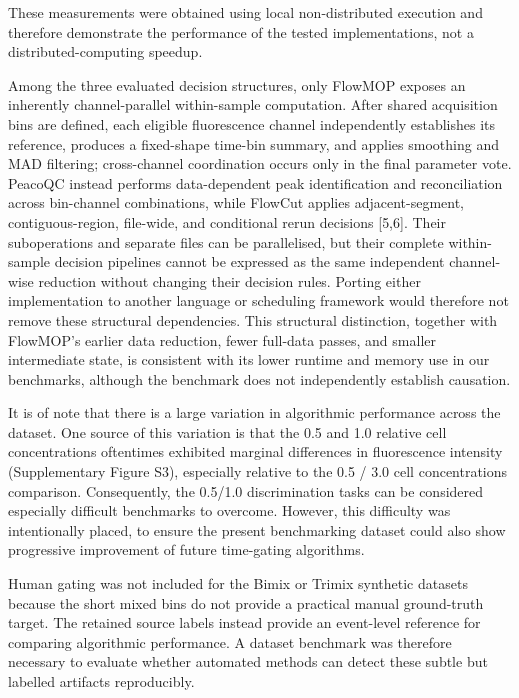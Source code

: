 \documentclass[ASNA]{latex/wiley/USG}
\begin{document}
These measurements were obtained using local non-distributed execution
and therefore demonstrate the performance of the tested implementations,
not a distributed-computing speedup.

Among the three evaluated decision structures, only FlowMOP exposes an
inherently channel-parallel within-sample computation. After shared
acquisition bins are defined, each eligible fluorescence channel
independently establishes its reference, produces a fixed-shape time-bin
summary, and applies smoothing and MAD filtering; cross-channel
coordination occurs only in the final parameter vote. PeacoQC instead
performs data-dependent peak identification and reconciliation across
bin-channel combinations, while FlowCut applies adjacent-segment,
contiguous-region, file-wide, and conditional rerun decisions {[}5,6{]}.
Their suboperations and separate files can be parallelised, but their
complete within-sample decision pipelines cannot be expressed as the
same independent channel-wise reduction without changing their decision
rules. Porting either implementation to another language or scheduling
framework would therefore not remove these structural dependencies. This
structural distinction, together with FlowMOP's earlier data reduction,
fewer full-data passes, and smaller intermediate state, is consistent
with its lower runtime and memory use in our benchmarks, although the
benchmark does not independently establish causation.

It is of note that there is a large variation in algorithmic performance
across the dataset. One source of this variation is that the 0.5 and 1.0
relative cell concentrations oftentimes exhibited marginal differences
in fluorescence intensity (Supplementary Figure S3), especially relative
to the 0.5 / 3.0 cell concentrations comparison. Consequently, the
0.5/1.0 discrimination tasks can be considered especially difficult
benchmarks to overcome. However, this difficulty was intentionally
placed, to ensure the present benchmarking dataset could also show
progressive improvement of future time-gating algorithms.

Human gating was not included for the Bimix or Trimix synthetic datasets
because the short mixed bins do not provide a practical manual
ground-truth target. The retained source labels instead provide an
event-level reference for comparing algorithmic performance. A dataset
benchmark was therefore necessary to evaluate whether automated methods
can detect these subtle but labelled artifacts reproducibly.
\end{document}
